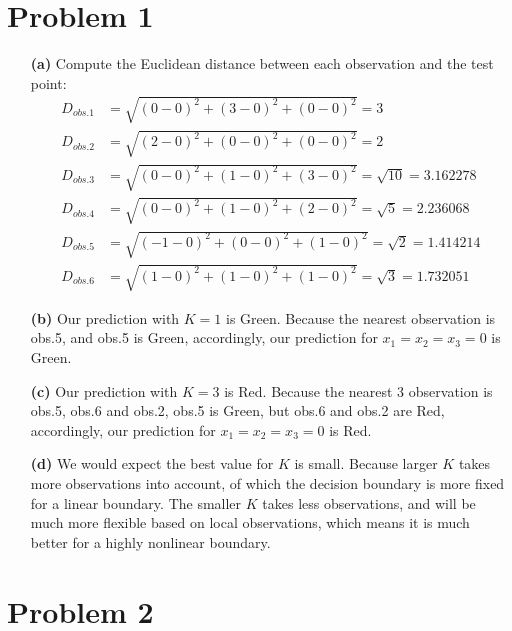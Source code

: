 \documentclass[twoside,11pt]{homework}
\begin{document}
\maketitle

\section*{Problem 1}

\begin{enumerate}
	
\item[\textbf{(a)}] Compute the Euclidean distance between each observation and the test point:
\begin{align*}
D_{obs.1} &= \sqrt{(0-0)^2+(3-0)^2+(0-0)^2} = 3 \\
D_{obs.2} &= \sqrt{(2-0)^2+(0-0)^2+(0-0)^2} = 2 \\
D_{obs.3} &= \sqrt{(0-0)^2+(1-0)^2+(3-0)^2} = \sqrt{10} = 3.162278 \\
D_{obs.4} &= \sqrt{(0-0)^2+(1-0)^2+(2-0)^2} = \sqrt{5} = 2.236068 \\
D_{obs.5} &= \sqrt{(-1-0)^2+(0-0)^2+(1-0)^2} = \sqrt{2} =  1.414214\\
D_{obs.6} &= \sqrt{(1-0)^2+(1-0)^2+(1-0)^2} = \sqrt{3} =1.732051
\end{align*}

\item[\textbf{(b)}] Our prediction with $K=1$ is Green. Because the nearest observation is obs.5, and obs.5 is Green, accordingly, our prediction for $x_1=x_2=x_3=0$ is Green.

\item[\textbf{(c)}] Our prediction with $K=3$ is Red. Because the nearest 3 observation is obs.5, obs.6 and obs.2, obs.5 is Green, but obs.6 and obs.2 are Red, accordingly, our prediction for $x_1=x_2=x_3=0$ is Red.

\item[\textbf{(d)}] We would expect the best value for $K$ is small. Because larger $K$ takes more observations into account, of which the decision boundary is more fixed for a linear boundary. The smaller $K$ takes less observations, and will be much more flexible based on local observations, which means it is much better for a highly nonlinear boundary.

\end{enumerate}



\section*{Problem 2}
\end{document}
